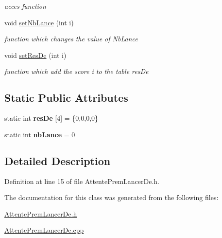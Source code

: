 \begin{DoxyCompactItemize}
\begin{DoxyCompactList}\small\item\em acces function \item\end{DoxyCompactList}\item 
\hypertarget{class_attente_prem_lancer_de_af2207571373366e478709dc6bb9e6952}{
void \hyperlink{class_attente_prem_lancer_de_af2207571373366e478709dc6bb9e6952}{setNbLance} (int i)}
\label{class_attente_prem_lancer_de_af2207571373366e478709dc6bb9e6952}

\begin{DoxyCompactList}\small\item\em function which changes the value of NbLance \item\end{DoxyCompactList}\item 
\hypertarget{class_attente_prem_lancer_de_ada7fc673258c30745df423c089ce3645}{
void \hyperlink{class_attente_prem_lancer_de_ada7fc673258c30745df423c089ce3645}{setResDe} (int i)}
\label{class_attente_prem_lancer_de_ada7fc673258c30745df423c089ce3645}

\begin{DoxyCompactList}\small\item\em function which add the score i to the table resDe \item\end{DoxyCompactList}\end{DoxyCompactItemize}
\subsection*{Static Public Attributes}
\begin{DoxyCompactItemize}
\item 
\hypertarget{class_attente_prem_lancer_de_a9ed7f030c6b7f05c4148544c59bf7906}{
static int {\bfseries resDe} \mbox{[}4\mbox{]} = \{0,0,0,0\}}
\label{class_attente_prem_lancer_de_a9ed7f030c6b7f05c4148544c59bf7906}

\item 
\hypertarget{class_attente_prem_lancer_de_a9119c223be540ff7b4588252c87fb970}{
static int {\bfseries nbLance} = 0}
\label{class_attente_prem_lancer_de_a9119c223be540ff7b4588252c87fb970}

\end{DoxyCompactItemize}


\subsection{Detailed Description}


Definition at line 15 of file AttentePremLancerDe.h.



The documentation for this class was generated from the following files:\begin{DoxyCompactItemize}
\item 
\hyperlink{_attente_prem_lancer_de_8h}{AttentePremLancerDe.h}\item 
\hyperlink{_attente_prem_lancer_de_8cpp}{AttentePremLancerDe.cpp}\end{DoxyCompactItemize}
